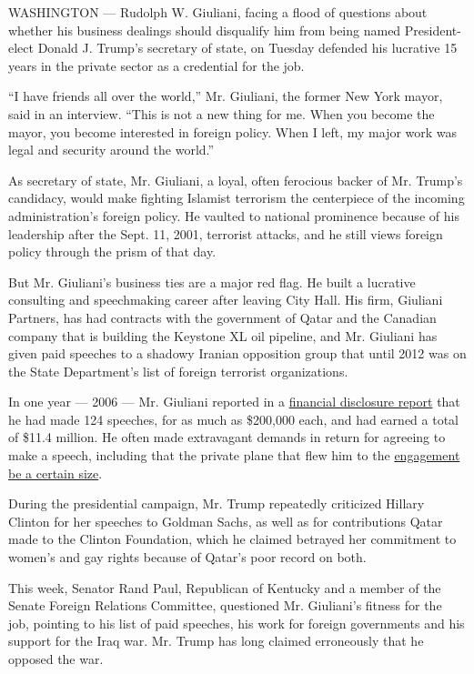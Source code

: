 WASHINGTON --- Rudolph W. Giuliani, facing a flood of questions about
whether his business dealings should disqualify him from being named
President-elect Donald J. Trump's secretary of state, on Tuesday
defended his lucrative 15 years in the private sector as a credential
for the job.

``I have friends all over the world,'' Mr. Giuliani, the former New York
mayor, said in an interview. ``This is not a new thing for me. When you
become the mayor, you become interested in foreign policy. When I left,
my major work was legal and security around the world.''

As secretary of state, Mr. Giuliani, a loyal, often ferocious backer of
Mr. Trump's candidacy, would make fighting Islamist terrorism the
centerpiece of the incoming administration's foreign policy. He vaulted
to national prominence because of his leadership after the Sept. 11,
2001, terrorist attacks, and he still views foreign policy through the
prism of that day.

But Mr. Giuliani's business ties are a major red flag. He built a
lucrative consulting and speechmaking career after leaving City Hall.
His firm, Giuliani Partners, has had contracts with the government of
Qatar and the Canadian company that is building the Keystone XL oil
pipeline, and Mr. Giuliani has given paid speeches to a shadowy Iranian
opposition group that until 2012 was on the State Department's list of
foreign terrorist organizations.

In one year --- 2006 --- Mr. Giuliani reported in a
\href{http://www.nytimes.com/2007/05/17/us/politics/17candidates.html}{financial
disclosure report} that he had made 124 speeches, for as much as
\$200,000 each, and had earned a total of \$11.4 million. He often made
extravagant demands in return for agreeing to make a speech, including
that the private plane that flew him to the
\href{http://www.thesmokinggun.com/file/rudy-giuliani-no-free-speech?page=0}{engagement
be a certain size}.

During the presidential campaign, Mr. Trump repeatedly criticized
Hillary Clinton for her speeches to Goldman Sachs, as well as for
contributions Qatar made to the Clinton Foundation, which he claimed
betrayed her commitment to women's and gay rights because of Qatar's
poor record on both.

This week, Senator Rand Paul, Republican of Kentucky and a member of the
Senate Foreign Relations Committee, questioned Mr. Giuliani's fitness
for the job, pointing to his list of paid speeches, his work for foreign
governments and his support for the Iraq war. Mr. Trump has long claimed
erroneously that he opposed the war.

